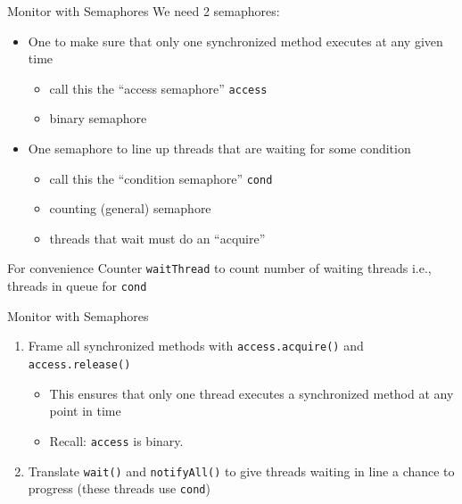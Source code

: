 \begin{frame}{Monitor with Semaphores}
  We need 2 semaphores:
  \begin{itemize}
  \item	One to make sure that only one synchronized method executes at any given time
    \begin{itemize}
    \item call this the ``access semaphore'' \lstinline!access!
    \item binary semaphore
    \end{itemize}
  \item One semaphore to line up threads that are waiting for some condition
    \begin{itemize}
    \item call this the ``condition semaphore'' \lstinline!cond!
    \item counting (general) semaphore
    \item threads that wait must do an ``acquire''
    \end{itemize}
  \end{itemize}


  \begin{block}{For convenience}
    Counter \lstinline!waitThread! to count number of waiting threads
    i.e., threads in queue for \lstinline!cond!
  \end{block}  
\end{frame}

\begin{frame}{Monitor with Semaphores}
  \begin{enumerate}
  \item Frame all synchronized methods with \lstinline!access.acquire()! and
    \lstinline!access.release()!
    \begin{itemize}
    \item This ensures that only one thread executes a synchronized
      method at any point in time
    \item Recall: \lstinline!access! is binary.
    \end{itemize}
  \item Translate \lstinline!wait()! and \lstinline!notifyAll()! to give threads waiting in
    line a chance to progress (these threads use \lstinline!cond!)
  \end{enumerate}  
\end{frame}

